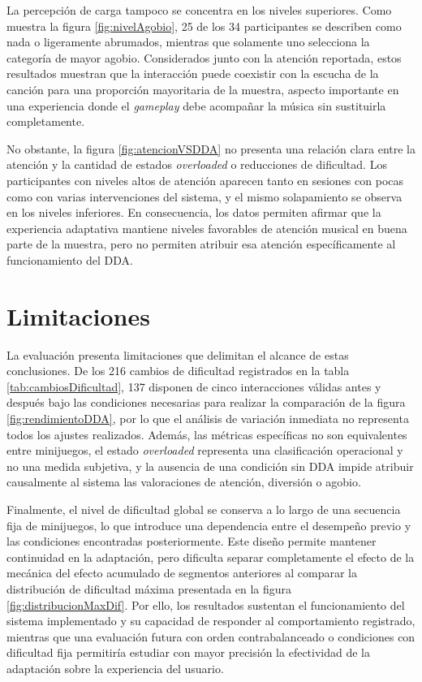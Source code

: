 La percepción de carga tampoco se concentra en los niveles superiores. 
Como muestra la figura \ref{fig:nivelAgobio}, 25 de los 34 participantes 
se describen como nada o ligeramente abrumados, mientras que solamente 
uno selecciona la categoría de mayor agobio. Considerados junto con la 
atención reportada, estos resultados muestran que la interacción puede 
coexistir con la escucha de la canción para una proporción mayoritaria 
de la muestra, aspecto importante en una experiencia donde el 
\textit{gameplay} debe acompañar la música sin sustituirla completamente.

No obstante, la figura \ref{fig:atencionVSDDA} no presenta una 
relación clara entre la atención y la cantidad de estados 
\textit{overloaded} o reducciones de dificultad. Los participantes con 
niveles altos de atención aparecen tanto en sesiones con pocas como con 
varias intervenciones del sistema, y el mismo solapamiento se observa en 
los niveles inferiores. En consecuencia, los datos permiten afirmar que 
la experiencia adaptativa mantiene niveles favorables de atención musical 
en buena parte de la muestra, pero no permiten atribuir esa atención 
específicamente al funcionamiento del DDA.

\section{Limitaciones}
La evaluación presenta limitaciones que delimitan el alcance de estas 
conclusiones. De los 216 cambios de dificultad registrados en la tabla
\ref{tab:cambiosDificultad}, 137 disponen de cinco interacciones válidas 
antes y después bajo las condiciones necesarias para realizar la 
comparación de la figura \ref{fig:rendimientoDDA}, por lo que el análisis 
de variación inmediata no representa todos los ajustes realizados. 
Además, las métricas específicas no son equivalentes entre minijuegos, 
el estado \textit{overloaded} representa una clasificación operacional y 
no una medida subjetiva, y la ausencia de una condición sin DDA impide 
atribuir causalmente al sistema las valoraciones de atención, diversión 
o agobio.

Finalmente, el nivel de dificultad global se conserva a lo largo de una 
secuencia fija de minijuegos, lo que introduce una dependencia entre el 
desempeño previo y las condiciones encontradas posteriormente. Este 
diseño permite mantener continuidad en la adaptación, pero dificulta 
separar completamente el efecto de la mecánica del efecto acumulado de 
segmentos anteriores al comparar la distribución de dificultad máxima 
presentada en la figura \ref{fig:distribucionMaxDif}. Por ello, los 
resultados sustentan el funcionamiento del sistema implementado y su 
capacidad de responder al comportamiento registrado, mientras que una 
evaluación futura con orden contrabalanceado o condiciones con dificultad 
fija permitiría estudiar con mayor precisión la efectividad de la 
adaptación sobre la experiencia del usuario.